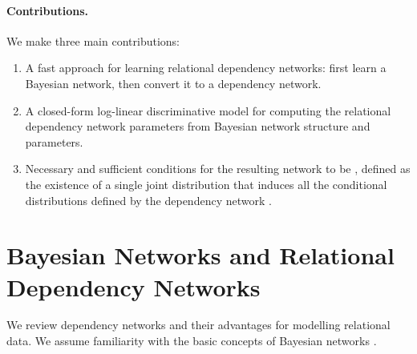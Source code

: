 \documentclass[runningheads,a4paper]{llncs}
\begin{document}
\paragraph{Contributions.}

We make three main contributions:
\begin{enumerate}
\item A fast approach for learning relational dependency networks: first learn a Bayesian network, then convert it to a dependency network.
\item A closed-form log-linear discriminative model for computing the relational dependency network parameters from Bayesian network structure and parameters.
\item Necessary and sufficient conditions for the resulting network to be , defined as the existence of a single joint distribution that induces all the conditional distributions defined by the dependency network \cite{Heckerman2000}.
\end{enumerate}

%  
 \section{Bayesian Networks and Relational Dependency Networks} We review dependency networks and their advantages for modelling relational data. We assume familiarity with the basic concepts of Bayesian networks \cite{Pearl1988}. 
\end{document}
